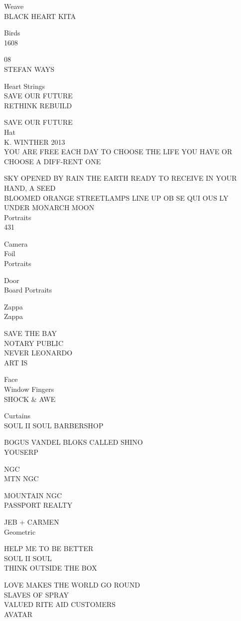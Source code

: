 \documentclass[10pt,letterpaper]{article}
\begin{document}
Weave\\
BLACK HEART KITA

Birds\\
1608

08\\
STEFAN WAYS

Heart Strings\\
SAVE OUR FUTURE\\
RETHINK REBUILD

SAVE OUR FUTURE\\
Hat\\
K. WINTHER 2013\\
YOU ARE FREE EACH DAY TO CHOOSE THE LIFE YOU HAVE OR CHOOSE A DIFF{-}RENT ONE

SKY OPENED BY RAIN THE EARTH READY TO RECEIVE IN YOUR HAND, A SEED\\
BLOOMED ORANGE STREETLAMPS LINE UP OB SE QUI OUS LY UNDER MONARCH MOON\\
Portraits\\
431

Camera\\
Foil\\
Portraits

Door\\
Board Portraits

Zappa\\
Zappa

SAVE THE BAY\\
NOTARY PUBLIC\\
NEVER LEONARDO\\
ART IS

Face\\
Window Fingers\\
SHOCK \& AWE

Curtains\\
SOUL II SOUL BARBERSHOP

BOGUS VANDEL BLOKS CALLED SHINO\\
YOUSERP

NGC\\
MTN NGC

MOUNTAIN NGC\\
PASSPORT REALTY

JEB + CARMEN\\
Geometric

HELP ME TO BE BETTER\\
SOUL II SOUL\\
THINK OUTSIDE THE BOX

LOVE MAKES THE WORLD GO ROUND\\
SLAVES OF SPRAY\\
VALUED RITE AID CUSTOMERS\\
AVATAR
\end{document}
